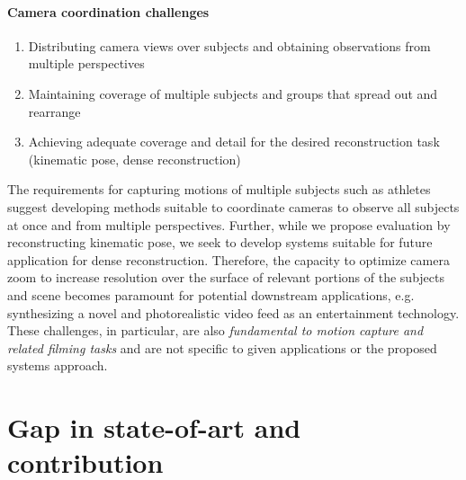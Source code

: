 \documentclass[11pt]{article}
\begin{document}
\paragraph{Camera coordination challenges}

\begin{enumerate}[resume]
  \item Distributing camera views over subjects and obtaining observations from
    multiple perspectives
  \item Maintaining coverage of multiple subjects and groups that spread out and
    rearrange
  \item Achieving adequate coverage and detail for the desired reconstruction
    task (kinematic pose, dense reconstruction)
\end{enumerate}
The requirements for capturing motions of multiple subjects such as athletes
suggest developing methods suitable to coordinate cameras to observe all
subjects at once and from multiple perspectives.
Further, while we propose evaluation by reconstructing kinematic pose, we seek
to develop systems suitable for future application for dense
reconstruction.
Therefore, the capacity to optimize camera zoom to increase resolution
over the surface of relevant portions of the subjects and scene becomes
paramount for potential downstream applications, e.g. synthesizing a novel and
photorealistic video feed as an entertainment technology.
%
These challenges, in particular, are also \emph{fundamental to motion capture
and related filming tasks} and are not specific to given applications or the
proposed systems approach.

\section{Gap in state-of-art and contribution}

\end{document}
